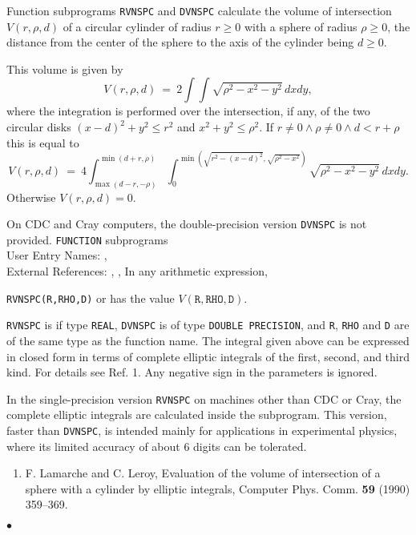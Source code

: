               
     
\Submitter{}                  
         \Revised{ }
Function subprograms {\tt RVNSPC} and {\tt DVNSPC} calculate the volume
of intersection $V(r,\rho,d)$ of a circular cylinder of radius
$r \geq 0$ with a sphere of radius $\rho \geq 0$, the distance from
the center of the sphere to the axis of the cylinder being $d \geq 0$.
\par
This volume is given by
$$ V(r,\rho,d) \ = \ \displaystyle
2 \int\!\!\!\int \sqrt{\rho^2-x^2-y^2} \, dx dy, $$
where the integration is performed over the intersection, if any,
of the two circular disks $(x-d)^2 + y^2 \leq r^2$
and $x^2 + y^2 \leq \rho^2$.
If $r \neq 0 \wedge \rho \neq 0 \wedge d < r+\rho$ this is equal to
$$ V(r,\rho,d) \ = \ \displaystyle
4 \int_{\max(d-r,-\rho)}^{\min(d+r,\rho)}
\int_0^{\min \left( \sqrt{r^2-(x-d)^2},\sqrt{\rho^2-x^2} \right)}
\sqrt{\rho^2-x^2-y^2} \, dx dy. $$
Otherwise $V(r,\rho,d) = 0$.
\par
On CDC and Cray computers, the double-precision version {\tt DVNSPC}
is not provided.
\Structure
{\tt FUNCTION} subprograms \\
User Entry Names: ,   \\
External References: , , 
\Usage
In any arithmetic expression,
\begin{center}
{\tt RVNSPC(R,RHO,D)} \quad or  \quad
has the value \quad $V(\mathtt{R,RHO,D})$.
\end{center}
{\tt RVNSPC} is if type {\tt REAL}, {\tt DVNSPC} is of type
{\tt DOUBLE PRECISION}, and {\tt R}, {\tt RHO} and {\tt D} are of the
same type as the function name.
\Method
The integral given above can be expressed in closed form in terms of
complete elliptic integrals of the first, second, and third kind.
For details see Ref. 1.
\Notes
Any negative sign in the parameters is ignored.
\par
In the single-precision version {\tt RVNSPC} on machines other than
CDC or Cray, the complete elliptic integrals are calculated
inside the subprogram. This version, faster than {\tt DVNSPC},
is intended mainly for applications in experimental physics, where its
limited accuracy of about 6 digits can be tolerated.
\Refer
\begin{enumerate}
\item F. Lamarche and C. Leroy, Evaluation of the volume of intersection
of a sphere with a cylinder by elliptic integrals, Computer Phys. Comm.
{\bf 59} (1990) 359--369.
\end{enumerate}
$\bullet$
